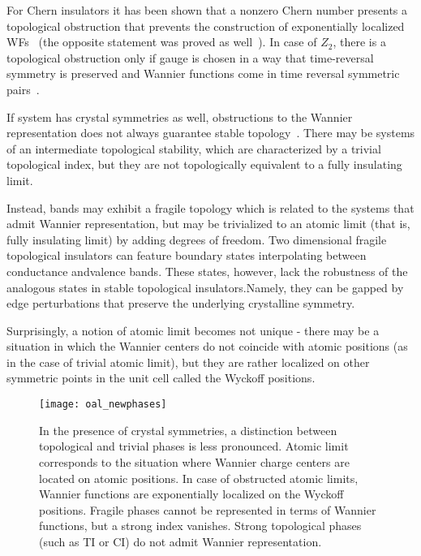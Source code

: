 For Chern insulators it has been shown that a nonzero Chern number presents a topological obstruction that prevents the construction of exponentially localized WFs~\cite{Thouless_1984, PhysRevB.74.235111} (the opposite statement was proved as well~\cite{PhysRevLett.98.046402}). In case of $Z_2$, there is a topological obstruction only if gauge is chosen in a way that time-reversal symmetry is preserved and Wannier functions come in time reversal symmetric pairs~\cite{PhysRevB.83.035108}.

If system has crystal symmetries as well, obstructions to the Wannier representation does not always guarantee stable topology~\cite{PhysRevLett.121.126402}. There may be systems of an intermediate topological stability, which are characterized by a trivial topological index, but they are not topologically equivalent to a fully insulating limit.



Instead, bands may exhibit a fragile topology which is related to the systems that admit Wannier representation, but may be trivialized to an atomic limit (that is, fully insulating limit) by adding degrees of freedom. Two dimensional fragile topological insulators can feature boundary states interpolating between conductance andvalence  bands.  These states,  however,  lack the  robustness of the analogous states in stable topological insulators.Namely, they can be gapped by edge perturbations that preserve the underlying crystalline symmetry.





Surprisingly, a notion of atomic limit becomes not unique - there may be a situation in which the Wannier centers do not coincide with atomic positions (as in the case of trivial atomic limit), but they are rather localized on other symmetric points in the unit cell called the Wyckoff positions.



\begin{figure}
\centering
\texttt{[image: oal\_newphases]}
\caption{In the presence of crystal symmetries, a distinction between topological and trivial phases is less pronounced. Atomic limit corresponds to the situation where Wannier charge centers are located on atomic positions. In case of obstructed atomic limits, Wannier functions are exponentially localized on the Wyckoff positions. Fragile phases cannot be represented in terms of Wannier functions, but a strong index vanishes. Strong topological phases (such as TI or CI) do not admit Wannier representation.}
\label{fig:newphases}
\end{figure}

